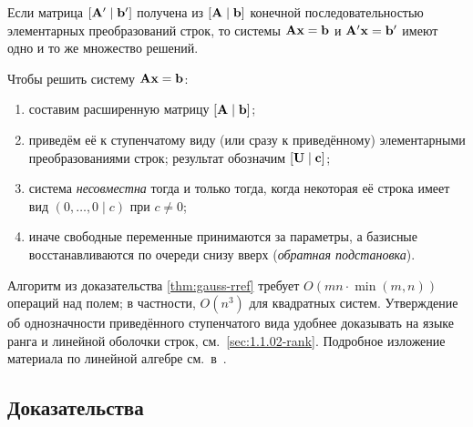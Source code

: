 \begin{theorem}
\label{thm:gauss-invariance}
Если матрица $[\mathbf{A}' \mid \mathbf{b}']$ получена из
$[\mathbf{A} \mid \mathbf{b}]$ конечной последовательностью элементарных
преобразований строк, то системы $\mathbf{A}\mathbf{x} = \mathbf{b}$ и
$\mathbf{A}'\mathbf{x} = \mathbf{b}'$ имеют одно и то же множество решений.
\end{theorem}

\begin{corollary}
\label{cor:gauss-solving}
Чтобы решить систему $\mathbf{A}\mathbf{x} = \mathbf{b}$:
\begin{enumerate}
  \item составим расширенную матрицу $[\mathbf{A} \mid \mathbf{b}]$;
  \item приведём её к ступенчатому виду (или сразу к приведённому)
        элементарными преобразованиями строк; результат обозначим
        $[\mathbf{U} \mid \mathbf{c}]$;
  \item система \emph{несовместна} тогда и только тогда, когда
        некоторая её строка имеет вид $(0, \dots, 0 \mid c)$ при
        $c \neq 0$;
  \item иначе свободные переменные принимаются за параметры, а
        базисные восстанавливаются по очереди снизу вверх
        (\emph{обратная подстановка}).
\end{enumerate}
\end{corollary}

\begin{remark}
\label{rem:gauss-complexity}
Алгоритм из доказательства \cref{thm:gauss-rref} требует
$O(mn \cdot \min(m, n))$ операций над полем; в частности, $O(n^3)$
для квадратных систем. Утверждение об однозначности приведённого
ступенчатого вида удобнее доказывать на языке ранга и линейной
оболочки строк, см.~\cref{sec:1.1.02-rank}. Подробное изложение
материала по линейной алгебре см.\ в~\cite{Beklemishev2025}.
\end{remark}

\subsection*{Доказательства}

